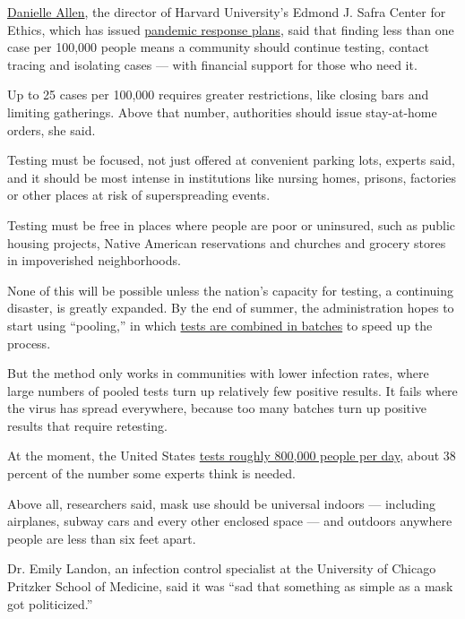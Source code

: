 \href{https://scholar.harvard.edu/danielleallen/home}{Danielle Allen},
the director of Harvard University's Edmond J. Safra Center for Ethics,
which has issued
\href{https://ethics.harvard.edu/news/path-zero-key-metrics}{pandemic
response plans}, said that finding less than one case per 100,000 people
means a community should continue testing, contact tracing and isolating
cases --- with financial support for those who need it.

Up to 25 cases per 100,000 requires greater restrictions, like closing
bars and limiting gatherings. Above that number, authorities should
issue stay-at-home orders, she said.

Testing must be focused, not just offered at convenient parking lots,
experts said, and it should be most intense in institutions like nursing
homes, prisons, factories or other places at risk of superspreading
events.

Testing must be free in places where people are poor or uninsured, such
as public housing projects, Native American reservations and churches
and grocery stores in impoverished neighborhoods.

None of this will be possible unless the nation's capacity for testing,
a continuing disaster, is greatly expanded. By the end of summer, the
administration hopes to start using ``pooling,'' in which
\href{https://www.nytimes3xbfgragh.onion/2020/07/01/health/coronavirus-pooled-testing.html}{tests
are combined in batches} to speed up the process.

But the method only works in communities with lower infection rates,
where large numbers of pooled tests turn up relatively few positive
results. It fails where the virus has spread everywhere, because too
many batches turn up positive results that require retesting.

At the moment, the United States
\href{https://www.nytimes3xbfgragh.onion/interactive/2020/us/coronavirus-testing.html}{tests
roughly 800,000 people per day}, about 38 percent of the number some
experts think is needed.

Above all, researchers said, mask use should be universal indoors ---
including airplanes, subway cars and every other enclosed space --- and
outdoors anywhere people are less than six feet apart.

Dr. Emily Landon, an infection control specialist at the University of
Chicago Pritzker School of Medicine, said it was ``sad that something as
simple as a mask got politicized.''

